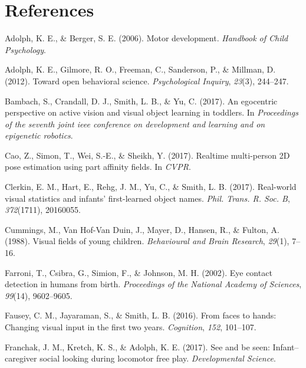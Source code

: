 \documentclass[10pt, letterpaper]{article}
\begin{document}
\vspace{1em}

\section{References}\label{references}

\setlength{\parindent}{-0.1in} \setlength{\leftskip}{0.125in} \noindent

\hypertarget{refs}{}
\hypertarget{ref-adolph2006motor}{}
Adolph, K. E., \& Berger, S. E. (2006). Motor development.
\emph{Handbook of Child Psychology}.

\hypertarget{ref-adolph2012toward}{}
Adolph, K. E., Gilmore, R. O., Freeman, C., Sanderson, P., \& Millman,
D. (2012). Toward open behavioral science. \emph{Psychological Inquiry},
\emph{23}(3), 244--247.

\hypertarget{ref-bambach2017}{}
Bambach, S., Crandall, D. J., Smith, L. B., \& Yu, C. (2017). An
egocentric perspective on active vision and visual object learning in
toddlers. In \emph{Proceedings of the seventh joint ieee conference on
development and learning and on epigenetic robotics}.

\hypertarget{ref-cao2017realtime}{}
Cao, Z., Simon, T., Wei, S.-E., \& Sheikh, Y. (2017). Realtime
multi-person 2D pose estimation using part affinity fields. In
\emph{CVPR}.

\hypertarget{ref-clerkin2017}{}
Clerkin, E. M., Hart, E., Rehg, J. M., Yu, C., \& Smith, L. B. (2017).
Real-world visual statistics and infants' first-learned object names.
\emph{Phil. Trans. R. Soc. B}, \emph{372}(1711), 20160055.

\hypertarget{ref-cummings1988}{}
Cummings, M., Van Hof-Van Duin, J., Mayer, D., Hansen, R., \& Fulton, A.
(1988). Visual fields of young children. \emph{Behavioural and Brain
Research}, \emph{29}(1), 7--16.

\hypertarget{ref-farroni2002eye}{}
Farroni, T., Csibra, G., Simion, F., \& Johnson, M. H. (2002). Eye
contact detection in humans from birth. \emph{Proceedings of the
National Academy of Sciences}, \emph{99}(14), 9602--9605.

\hypertarget{ref-fausey2016}{}
Fausey, C. M., Jayaraman, S., \& Smith, L. B. (2016). From faces to
hands: Changing visual input in the first two years. \emph{Cognition},
\emph{152}, 101--107.

\hypertarget{ref-franchak2017see}{}
Franchak, J. M., Kretch, K. S., \& Adolph, K. E. (2017). See and be
seen: Infant--caregiver social looking during locomotor free play.
\emph{Developmental Science}.
\end{document}
